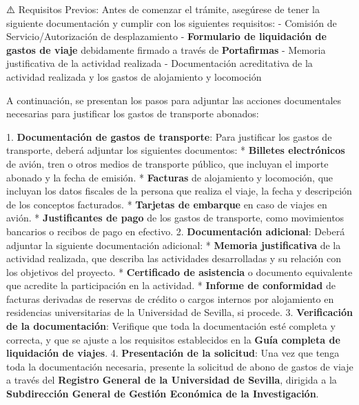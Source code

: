 \documentclass{article}
\begin{document}
\begin{itemize}
\begin{itemize}
                ⚠️ Requisitos Previos:
                Antes de comenzar el trámite, asegúrese de tener la siguiente documentación y cumplir con los siguientes requisitos:
                - Comisión de Servicio/Autorización de desplazamiento
                - \textbf{Formulario de liquidación de gastos de viaje} debidamente firmado a través de \textbf{Portafirmas}
                - Memoria justificativa de la actividad realizada
                - Documentación acreditativa de la actividad realizada y los gastos de alojamiento y locomoción

                A continuación, se presentan los pasos para adjuntar las acciones documentales necesarias para justificar los gastos de transporte abonados:

                1. \textbf{Documentación de gastos de transporte}: Para justificar los gastos de transporte, deberá adjuntar los siguientes documentos:
                * \textbf{Billetes electrónicos} de avión, tren o otros medios de transporte público, que incluyan el importe abonado y la fecha de emisión.
                * \textbf{Facturas} de alojamiento y locomoción, que incluyan los datos fiscales de la persona que realiza el viaje, la fecha y descripción de los conceptos facturados.
                * \textbf{Tarjetas de embarque} en caso de viajes en avión.
                * \textbf{Justificantes de pago} de los gastos de transporte, como movimientos bancarios o recibos de pago en efectivo.
                2. \textbf{Documentación adicional}: Deberá adjuntar la siguiente documentación adicional:
                * \textbf{Memoria justificativa} de la actividad realizada, que describa las actividades desarrolladas y su relación con los objetivos del proyecto.
                * \textbf{Certificado de asistencia} o documento equivalente que acredite la participación en la actividad.
                * \textbf{Informe de conformidad} de facturas derivadas de reservas de crédito o cargos internos por alojamiento en residencias universitarias de la Universidad de Sevilla, si procede.
                3. \textbf{Verificación de la documentación}: Verifique que toda la documentación esté completa y correcta, y que se ajuste a los requisitos establecidos en la \textbf{Guía completa de liquidación de viajes}.
                4. \textbf{Presentación de la solicitud}: Una vez que tenga toda la documentación necesaria, presente la solicitud de abono de gastos de viaje a través del \textbf{Registro General de la Universidad de Sevilla}, dirigida a la \textbf{Subdirección General de Gestión Económica de la Investigación}.


\end{itemize}
\end{itemize}
\end{document}
